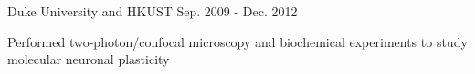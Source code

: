 

\begin{cventries}

  \cvsimpleentry
    {} %
    {Duke University and HKUST} %
    {} %
    {Sep. 2009 - Dec. 2012} %
     {
      \begin{cvitems} %
        \item {Performed two-photon/confocal microscopy and biochemical experiments to study molecular neuronal plasticity}
      \end{cvitems}
    }


\end{cventries}
